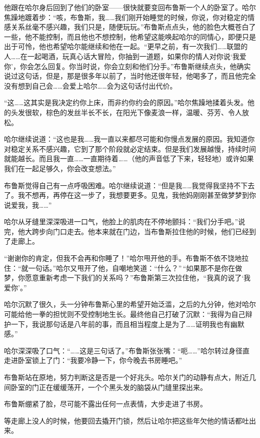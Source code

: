 \documentclass[../main.tex]{subfiles}
\begin{document}
他跟在哈尔身后回到了他们的卧室——很快就要变回布鲁斯一个人的卧室了。哈尔焦躁地踱着步：“咳，布鲁斯，我……我们刚开始睡觉的时候，你说，你对稳定的情感关系丝毫不感兴趣，我们只是，随便玩玩。”布鲁斯点点头，他的脸色大概苍白了一些，他不能控制，而且他也不想控制，他希望这能唤起哈尔的同情心，即便只是出于可怜，他也希望哈尔能继续和他在一起。“更早之前，有一次我们……联盟的人……在一起喝酒，玩真心话大冒险，你抽到一道题，如果你的情人对你说`我爱你'，你会怎么回复。你当时说，你会立刻和他们分手。”布鲁斯继续点头，他确实说过这句话，但是，那是很多年以前了，当时他还很年轻，他喝多了，而且他完全没有想到自己会……会爱上哈尔……会为这句话付出代价。

“这……这其实是我决定约你上床，而非约你约会的原因。”哈尔焦躁地揉着头发。他的头发很软，棕色的发丝半长不长，在阳光下像麦浪一样，温暖、芬芳、令人放松。

哈尔继续说道：“这也是我……我一直以来都尽可能和你慢点发展的原因。我知道你对稳定关系不感兴趣，它到了那个阶段就必定结束。但是我们发展越慢，持续时间就能越长。而且我一直……一直期待着……（他的声音低了下来，轻轻地）或许如果我们在一起足够久，你会改变想法。”

布鲁斯觉得自己有一点呼吸困难。哈尔继续说道：“但是我……我觉得我坚持不下去了。我不想再，再停在这一步了，我想要更多。见鬼，我他妈刚刚甚至做梦梦到你说爱我，我……”

哈尔从牙缝里深深吸进一口气，他脸上的肌肉在不停地颤抖：“我们分手吧。”说完，他大跨步向门口走去。他本来就在门边，当布鲁斯拉住他的时候，他们已经到了走廊上。

“谢谢你的肯定，但我不会再和你睡了！”哈尔甩开他的手。布鲁斯不依不饶地拉住：“就一句话。”哈尔又甩开了他，自嘲地笑道：“什么？”\,“如果那不是你在做梦，你愿意重新考虑一下我们的关系吗？”布鲁斯第三次拉住他，“我真的说了`我爱你'。”

哈尔沉默了很久，头一分钟布鲁斯心里的希望开始泛滥，之后的九分钟，他对哈尔可能给他一拳的担忧则不受控制地生长。最终他自己打破了沉默：“我得为自己辩护一下，我说那句话是八年前的事，而且相当程度上是为了……证明我也有幽默感。”

哈尔深深吸了口气：“……这是三句话了。”布鲁斯张张嘴：“呃……”哈尔转过身径直走进卧室锁上了门：“我要冷静一下，你今晚去书房睡吧。”

布鲁斯站在原地，努力判断这是否是一个好兆头。哈尔关门的动静有点大，附近几间卧室的门正在缓缓荡开，一个个黑头发的脑袋从门缝里探出来。

布鲁斯绷紧了脸，尽可能不露出任何一点表情，大步走进了书房。

等走廊上没人的时候，他要回去撬开门锁，然后让哈尔把这些年欠他的情话都吐出来。

\storyend

\end{document}
